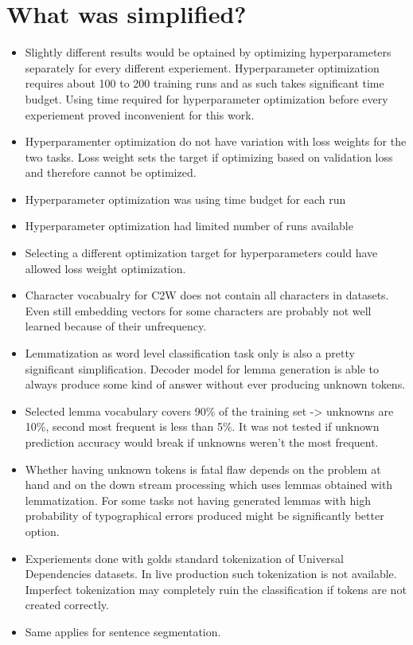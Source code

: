 \documentclass[12pt,a4paper,english
]{tutthesis}
\begin{document}
\section{What was simplified?}
\begin{itemize}
\item Slightly different results would be optained by optimizing hyperparameters separately for every different experiement. Hyperparameter optimization requires about 100 to 200 training runs and as such takes significant time budget. Using time required for hyperparameter optimization before every experiement proved inconvenient for this work.
\item Hyperparamenter optimization do not have variation with loss weights for the two tasks. Loss weight sets the target if optimizing based on validation loss and therefore cannot be optimized.
\item Hyperparameter optimization was using time budget for each run
\item Hyperparameter optimization had limited number of runs available
\item Selecting a different optimization target for hyperparameters could have allowed loss weight optimization.
\item Character vocabualry for C2W does not contain all characters in datasets. Even still embedding vectors for some characters are probably not well learned because of their unfrequency. 
\item Lemmatization as word level classification task only is also a pretty significant simplification. Decoder model for lemma generation is able to always produce some kind of answer without ever producing unknown tokens.
\item Selected lemma vocabulary covers 90\% of the training set -> unknowns are 10\%, second most frequent is less than 5\%. It was not tested if unknown prediction accuracy would break if unknowns weren't the most frequent.
\item Whether having unknown tokens is fatal flaw depends on the problem at hand and on the down stream processing which uses lemmas obtained with lemmatization. For some tasks not having generated lemmas with high probability of typographical errors produced might be significantly better option.
\item Experiements done with golds standard tokenization of Universal Dependencies datasets. In live production such tokenization is not available. Imperfect tokenization may completely ruin the classification if tokens are not created correctly.
\item Same applies for sentence segmentation.
\end{itemize}
\end{document}
